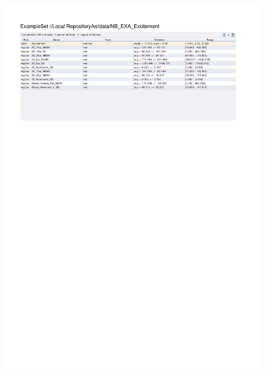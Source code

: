 \begin{figure}[htp]
  \centerline{\includegraphics[trim=0 630 0 60,clip,width=16.09cm]{results/NB_EXA_Excitement.pdf}} \caption{
} \label{NB_K_Excitement}
\end{figure}

